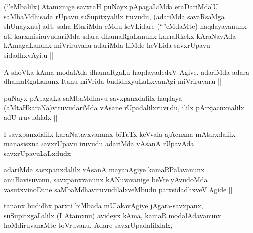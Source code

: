 
\begin{artha}
(`\stext'eMbalilx) Atamxnige savxtaH puNayx pApagaLiMda eraDariMdalU saMbaMdhisada rUpavu suSupitxyalilx iruvudu, (adariMda savaRsaMga shUnayxnu) adU saha EtariMda eMdu keVLidare (``\stext''eMdaMte) haqdayavanunx ati karxmisiruvudariMda adara dhamaRgaLanunx kamaRkekx kAraNavAda kAmagaLanunx miVriruvanu adariMda hiMde heVLida savxrUpavu sidadhxvAyitu ||
\end{artha}


\begin{artha}
A shoVka kAma modalAda dhamaRgaLu haqdayadedxV Agive. adariMda adara dhamaRgaLanunx Itanu miVrida budidhxyuLaLxvanAgi miVriruvanu ||
\end{artha}


\begin{artha}
puNayx pApagaLa saMbaMdhavu savxpanxdalilx haqdaya (aMtaHkaraNa)viruvudariMda vAsane rUpadalilxruvudu, ililx pArxjacnxnalilx adU iruvudilalx ||
\end{artha}


\begin{artha}
I savxpanxdalilx karaNatavxvanunx biTuTx keVvala ajAcnxna mAtarxdalilx manasisxna savxrUpavu iruvudu adariMda vAsanA rUpavAda savxrUpavuLaLxdudx ||
\end{artha}


\begin{artha}
adariMda savxpanxdalilx vAsanA mayanAgiye kamaRPalavanunx anuBavisuvanu, savxpanxvanunx kANuvavanige beVre yAvudoMda vasutxvinoDane saMbaMdhaviruvudilalxveMbudu parxsidadhxveV Agide ||
\end{artha}

\begin{artha}
tananx budidhx parxti biMbada mUlakavAgiye jAgara-savxpanx, suSupitxgaLalilx (I Atamxnu) avideyx kAma, kamaR modalAdavanunx hoMdiruvanaMte toVruvanu, Adare savxrUpadalilxlalx, 
\end{artha}


